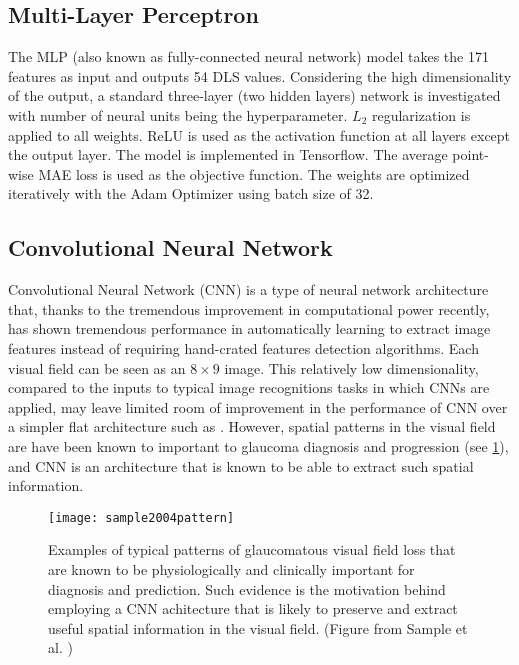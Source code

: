 \subsection{Multi-Layer Perceptron}

The \ac{MLP} (also known as fully-connected neural network) model takes the 171 features as input and outputs 54 \ac{DLS} values. Considering the high dimensionality of the output, a standard three-layer (two hidden layers) network is investigated with number of neural units being the hyperparameter. $L_2$ regularization is applied to all weights. ReLU is used as the activation function at all layers except the output layer. The model is implemented in Tensorflow. \cite{tensorflow} The average point-wise \ac{MAE} loss is used as the objective function. The weights are optimized iteratively with the Adam Optimizer using batch size of 32.

\subsection{Convolutional Neural Network}

Convolutional Neural Network (CNN) is a type of neural network architecture that, thanks to the tremendous improvement in computational power recently, has shown tremendous performance in automatically learning to extract image features instead of requiring hand-crated features detection algorithms. Each visual field can be seen as an $8\times9$ image. This relatively low dimensionality, compared to the inputs to typical image recognitions tasks in which \acp{CNN} are applied, may leave limited room of improvement in the performance of \ac{CNN} over a simpler flat architecture such as . However, spatial patterns in the visual field are have been known to important to glaucoma diagnosis and progression (see \cref{fig:fieldpattern}), and \ac{CNN} is an architecture that is known to be able to extract such spatial information. 

\begin{figure}[p]
	\centering
	\texttt{[image: sample2004pattern]}
	\caption[Examples of typical patterns of glaucomatous visual field loss]{Examples of typical patterns of glaucomatous visual field loss that are known to be physiologically and clinically important for diagnosis and prediction. Such evidence is the motivation behind employing a \ac{CNN} achitecture that is likely to preserve and extract useful spatial information in the visual field. (Figure from Sample et al. \cite{Sample2004})}
	\label{fig:fieldpattern}
\end{figure}

